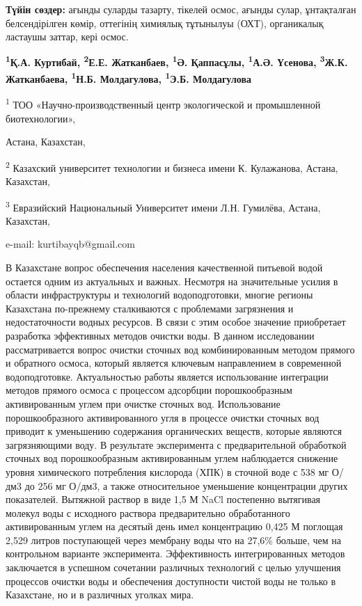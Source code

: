 {\bfseries Түйін сөздер:} ағынды суларды тазарту, тікелей осмос, ағынды
сулар, ұнтақталған белсендірілген көмір, оттегінің химиялық тұтынылуы
(ОХТ), органикалық ластаушы заттар, кері осмос.


\begin{center}
{\bfseries \textsuperscript{1}Қ.А. Куртибай\envelope, \textsuperscript{2}Е.Е.
Жатканбаев, \textsuperscript{1}Ә. Қаппасұлы, \textsuperscript{1}А.Ә.
Үсенова, \textsuperscript{3}Ж.К. Жатканбаева, \textsuperscript{1}Н.Б.
Молдагулова, \textsuperscript{1}Э.Б. Молдагулова}

\textsuperscript{1} ТОО «Научно-производственный центр экологической и
промышленной биотехнологии»,

Астана, Казахстан,

\textsuperscript{2} Казахский университет технологии и бизнеса имени К.
Кулажанова, Астана, Казахстан,

\textsuperscript{3} Евразийский Национальный Университет имени Л.Н.
Гумилёва, Астана, Казахстан,

e-mail: kurtibayqb@gmail.com
\end{center}

В Казахстане вопрос обеспечения населения качественной питьевой водой
остается одним из актуальных и важных. Несмотря на значительные усилия в
области инфраструктуры и технологий водоподготовки, многие регионы
Казахстана по-прежнему сталкиваются с проблемами загрязнения и
недостаточности водных ресурсов. В связи с этим особое значение
приобретает разработка эффективных методов очистки воды. В данном
исследовании рассматривается вопрос очистки сточных вод комбинированным
методом прямого и обратного осмоса, который является ключевым
направлением в современной водоподготовке. Актуальностью работы является
использование интеграции методов прямого осмоса с процессом адсорбции
порошкообразным активированным углем при очистке сточных вод.
Использование порошкообразного активированного угля в процессе очистки
сточных вод приводит к уменьшению содержания органических веществ,
которые являются загрязняющими воду. В результате эксперимента с
предварительной обработкой сточных вод порошкообразным активированным
углем наблюдается снижение уровня химического потребления кислорода
(ХПК) в сточной воде с 538 мг О/дм3 до 256 мг О/дм3, а также
относительное уменьшение концентрации других показателей. Вытяжной
раствор в виде 1,5 М NaCl постепенно вытягивая молекул воды с исходного
раствора предварительно обработанного активированным углем на десятый
день имел концентрацию 0,425 М поглощая 2,529 литров поступающей через
мембрану воды что на 27,6\% больше, чем на контрольном варианте
эксперимента. Эффективность интегрированных методов заключается в
успешном сочетании различных технологий с целью улучшения процессов
очистки воды и обеспечения доступности чистой воды не только в
Казахстане, но и в различных уголках мира.

